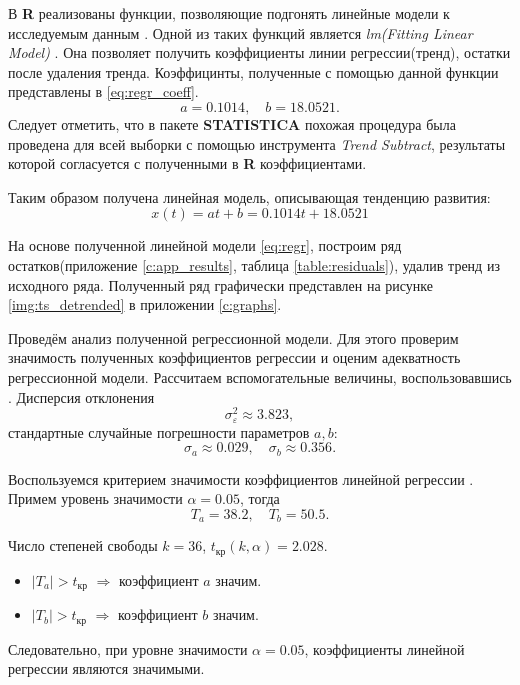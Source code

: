В \textbf{R} реализованы функции, позволяющие подгонять линейные модели к исследуемым данным \cite{Shumway2006Time}. Одной из таких функций является \textit{lm(Fitting Linear Model)} \cite[c.178]{Kabacoff2009R}. Она позволяет получить коэффициенты линии регрессии(тренд), остатки после удаления тренда. Коэффицинты, полученные с помощью данной функции представлены в \eqref{eq:regr_coeff}.
\begin{equation}
\label{eq:regr_coeff}
	a = 0.1014, \quad b = 18.0521.
\end{equation}
Следует отметить, что в пакете \textbf{STATISTICA} похожая процедура была проведена для всей выборки с помощью инструмента \textit{Trend Subtract}, результаты которой согласуется с полученными в \textbf{R} коэффициентами.

Таким образом получена линейная модель, описывающая тенденцию развития:
\begin{equation}
\label{eq:regr}
	x(t) = at + b = 0.1014t + 18.0521
\end{equation}

На основе полученной линейной модели \eqref{eq:regr}, построим ряд остатков(приложение \ref{c:app_results}, таблица \ref{table:residuals}), удалив тренд из исходного ряда. Полученный ряд графически представлен на рисунке \ref{img:ts_detrended} в приложении \ref{c:graphs}.

Проведём анализ полученной регрессионной модели. Для этого проверим значимость полученных коэффициентов регрессии и оценим адекватность регрессионной модели.
Рассчитаем вспомогательные величины, воспользовавшись \cite{Eddows1997}. Дисперсия отклонения
\begin{equation*}
	\sigma_{\varepsilon}^2 \approx 3.823,
\end{equation*}
стандартные случайные погрешности параметров $a, b$:
\begin{equation*}
	\sigma_{a} \approx 0.029, \quad \sigma_{b} \approx 0.356.
\end{equation*}

Воспользуемся критерием значимости коэффициентов линейной регрессии \cite{Eliseeva1995}. Примем уровень значимости $\alpha = 0.05$, тогда
\begin{equation*}
	T_{a} = 38.2, \quad T_{b} = 50.5.
\end{equation*}

Число степеней свободы $k = 36$, $t_{\textrm{кр}}(k, \alpha) = 2.028$.

\begin{itemize}
	\item $\vert T_{a} \vert > t_{\textrm{кр}}$ $\Rightarrow$ коэффициент $a$ значим.
	\item $\vert T_{b} \vert > t_{\textrm{кр}}$ $\Rightarrow$ коэффициент $b$ значим.
\end{itemize}
Следовательно, при уровне значимости $\alpha = 0.05$, коэффициенты линейной регрессии являются значимыми.

